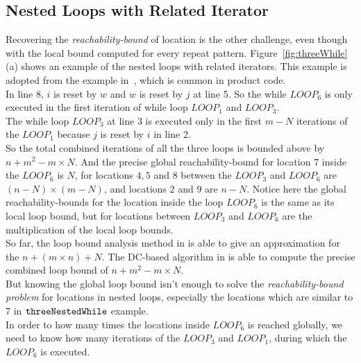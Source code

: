 \subsection{Nested Loops with Related Iterator}
\label{sec:overview-nestedwhile}
Recovering the \emph{reachability-bound} of location is the other challenge, even though with
the local bound computed for every repeat pattern.
Figure~\ref{fig:threeWhile}(a) shows an example of the nested loops with related 
iterators.
This example is adopted from the example in~\cite{GulwaniJK09}, which is common in product code.
\\
In line 8, $i$ is reset by $w$ and $w$ is reset by $j$ at line 5. So the
while $LOOP_6$ is only executed in the first iteration of while loop $LOOP_1$ and $LOOP_3$.
\\
The while loop $LOOP_3$ at line 3 is executed only in 
the first $m - N$ iterations of the 
$LOOP_1$ because $j$ is reset by $i$ in line 2.
\\
So the total combined iterations of all the three loops is bounded above by 
$n + m^2 - m \times N$.
And the precise global reachability-bound for location $7$ inside the $LOOP_6$ is $N$,
for locations $4, 5$ and $8$ between the $LOOP_3$ and $LOOP_6$ are $(n-N) \times (m - N)$,
and locations $2$ and $9$ are $n - N$.
Notice here the global reachability-bounds for the location inside the loop $LOOP_6$ is 
the same as its local loop bound,
but for locations between $LOOP_3$ and $LOOP_6$ are the multiplication of the local loop bounds.
\\
So far, the loop bound analysis method in \cite{GulwaniJK09} is able to give
an approximation for the $n + (m \times n) + N$. 
The DC-based algorithm in \cite{sinn2017complexity} is able to
compute the precise combined loop bound of $n + m^2 - m \times N$.
\\
But knowing the global loop bound isn't enough to solve the \emph{reachability-bound problem} for locations in nested loops,
especially the locations which are similar to $7$ in ${\mathtt{threeNestedWhile}}$ example.
\\
In order to how many times the locations inside
$LOOP_6$ is reached globally, we need to know
how many iterations of the $LOOP_3$ and $LOOP_1$, 
during which the $LOOP_6$ is executed.

